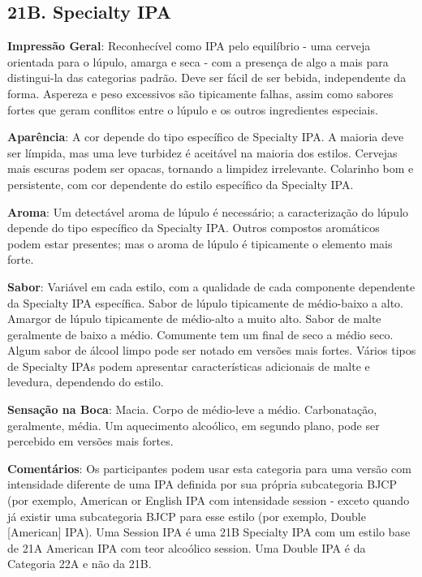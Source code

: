 \subsection*{21B. Specialty IPA}
\textbf{Impressão Geral}: Reconhecível como IPA pelo equilíbrio - uma cerveja orientada para o lúpulo, amarga e seca - com a presença de algo a mais para distingui-la das categorias padrão. Deve ser fácil de ser bebida, independente da forma. Aspereza e peso excessivos são tipicamente falhas, assim como sabores fortes que geram conflitos entre o lúpulo e os outros ingredientes especiais.

\textbf{Aparência}: A cor depende do tipo específico de Specialty IPA. A maioria deve ser límpida, mas uma leve turbidez é aceitável na maioria dos estilos. Cervejas mais escuras podem ser opacas, tornando a limpidez irrelevante. Colarinho bom e persistente, com cor dependente do estilo específico da Specialty IPA.

\textbf{Aroma}: Um detectável aroma de lúpulo é necessário; a caracterização do lúpulo depende do tipo específico da Specialty IPA. Outros compostos aromáticos podem estar presentes; mas o aroma de lúpulo é tipicamente o elemento mais forte.

\textbf{Sabor}: Variável em cada estilo, com a qualidade de cada componente dependente da Specialty IPA específica. Sabor de lúpulo tipicamente de médio-baixo a alto. Amargor de lúpulo tipicamente de médio-alto a muito alto. Sabor de malte geralmente de baixo a médio. Comumente tem um final de seco a médio seco. Algum sabor de álcool limpo pode ser notado em versões mais fortes. Vários tipos de Specialty IPAs podem apresentar características adicionais de malte e levedura, dependendo do estilo.

\textbf{Sensação na Boca}: Macia. Corpo de médio-leve a médio. Carbonatação, geralmente, média. Um aquecimento alcoólico, em segundo plano, pode ser percebido em versões mais fortes.

\textbf{Comentários}: Os participantes podem usar esta categoria para uma versão com intensidade diferente de uma IPA definida por sua própria subcategoria BJCP (por exemplo, American or English IPA com intensidade session - exceto quando já existir uma subcategoria BJCP para esse estilo (por exemplo, Double [American] IPA). Uma Session IPA é uma 21B Specialty IPA com um estilo base de 21A American IPA com teor alcoólico session. Uma Double IPA é da Categoria 22A e não da 21B.

